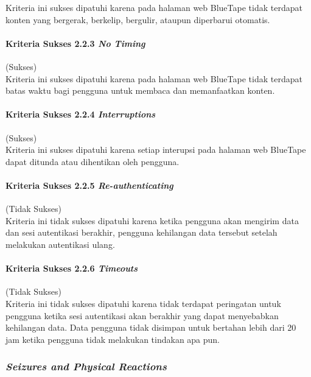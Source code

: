 Kriteria ini sukses dipatuhi karena pada halaman web BlueTape tidak terdapat konten yang bergerak, berkelip, bergulir, ataupun diperbarui otomatis.

\paragraph{Kriteria Sukses 2.2.3 \textit{No Timing}}
\label{par:kepatuhan_bluetape_kriteria_sukses_2.2.3}
(Sukses)\\

Kriteria ini sukses dipatuhi karena pada halaman web BlueTape tidak terdapat batas waktu bagi pengguna untuk membaca dan memanfaatkan konten.

\paragraph{Kriteria Sukses 2.2.4 \textit{Interruptions}}
\label{par:kepatuhan_bluetape_kriteria_sukses_2.2.4}
(Sukses)\\

Kriteria ini sukses dipatuhi karena setiap interupsi pada halaman web BlueTape dapat ditunda atau dihentikan oleh pengguna.

\paragraph{Kriteria Sukses 2.2.5 \textit{Re-authenticating}}
\label{par:kepatuhan_bluetape_kriteria_sukses_2.2.5}
(Tidak Sukses)\\

Kriteria ini tidak sukses dipatuhi karena ketika pengguna akan mengirim data dan sesi autentikasi berakhir, pengguna kehilangan data tersebut setelah melakukan autentikasi ulang.

\paragraph{Kriteria Sukses 2.2.6 \textit{Timeouts}}
\label{par:kepatuhan_bluetape_kriteria_sukses_2.2.6}
(Tidak Sukses)\\

Kriteria ini tidak sukses dipatuhi karena tidak terdapat peringatan untuk pengguna ketika sesi autentikasi akan berakhir yang dapat menyebabkan kehilangan data. Data pengguna tidak disimpan untuk bertahan lebih dari 20 jam ketika pengguna tidak melakukan tindakan apa pun.

\subsubsection{\textit{Seizures and Physical Reactions}}
\label{subsubsec:kepatuhan_bluetape_seizures_and_physical_reactions}

